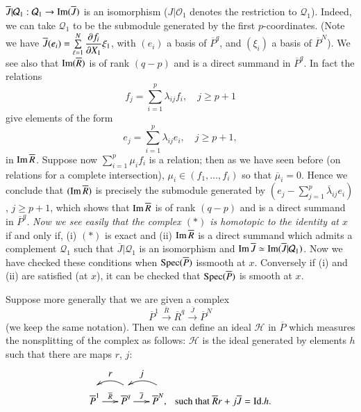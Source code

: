 \begin{remark}
  $\overline{J}|\mathcal{Q}_{1}:\mathcal{Q}_{1}\to \operatorname{Im}(\overline{J})$
  is an isomorphism ($J|\mathcal{O}_{1}$ denotes the restriction to
  $\mathcal{Q}_{1}$). Indeed, we can take $\mathcal{Q}_{1}$ to be the
  submodule generated by the first $p$-coordinates. (Note we have
  $\overline{J}(e_{i})=\sum\limits^{N}_{\ell=1}\dfrac{\partial f_{i}}{\partial
    X_{1}}\xi_{1}$, with $(e_{i})$ a basis of $\overline{P}^{q}$, and
  $(\xi_{i})$ a basis of $\overline{P}^{N}$). We see also that
  $\operatorname{Im}(\overline{R})$ is of rank $(q-p)$ and is a direct summand in
  $\overline{P}^{q}$. In fact the relations
$$
f_{j}=\sum^{p}_{i=1}\lambda_{ij}f_{i},\quad j\geq p+1
$$
give elements of the form
$$
e_{j}=\sum^{p}_{i=1}\lambda_{ij}e_{i},\quad j\geq p+1,
$$
in $\operatorname{Im}\overline{R}$. Suppose now $\sum\limits^{p}_{i=1}\mu_{i}f_{i}$
is a relation; then as we have seen before (on relations for a
complete intersection), $\mu_{i}\in (f_{1},\ldots,f_{i})$ so that
$\overline{\mu}_{i}=0$. Hence we conclude that $(\operatorname{Im} \overline{R})$
is precisely the submodule generated by
$(e_{j}-\sum\limits^{p}_{j=1}\overline{\lambda}_{ij}e_{i})$, $j\geq
p+1$, which shows that $\operatorname{Im} \overline{R}$ is of rank $(q-p)$ and is a
direct summand in $\overline{P}^{q}$. {\em Now we see easily that the
  complex $(*)$ is homotopic to the identity at $x$} if and only if,
(i) $(*)$ is exact and (ii) $\operatorname{Im} \overline{R}$ is a direct summand
which admits a complement $\mathcal{Q}_{1}$ such that
$\overline{J}|\mathcal{Q}_{1}$ is an isomorphism and
$\operatorname{Im}\overline{J}\simeq \operatorname{Im}(\overline{J}|\mathcal{Q}_{1})$. Now we
have checked these conditions when $\operatorname{Spec}(\overline{P})$ 
is\pageoriginale smooth at $x$. Conversely if (i) and (ii) are
satisfied (at $x$), it can be checked that $\operatorname{Spec} (\overline{P})$ is
smooth at $x$.
\end{remark}

Suppose more generally that we are given a complex
$$
\overline{P}^{1}\xrightarrow{\overline{R}}\overline{R}^{q}\xrightarrow{\overline{J}}\overline{P}^{N} 
$$
(we keep the same notation). Then we can define an ideal $\mathscr{H}$
in $\overline{P}$ which measures the nonsplitting of the complex as
follows: $\mathscr{H}$ is the ideal generated by elements $h$ such
that there are maps $r$, $j$:
\[
\xymatrix@C=.1cm@R=.1cm{
 & r & & j & & \\
 &  & \ar@/_/[ll] &   &\ar@/_/[ll] & \\
\overline{P}^{1}\ar[rr]^-{\overline{R}} & &
\overline{P}^{q}\ar[rr]^-{\overline{J}} & &
\overline{P}^{N}, & \text{such that~ }
\overline{R}r+j\overline{J}=\text{Id.}h.  
}
\]

